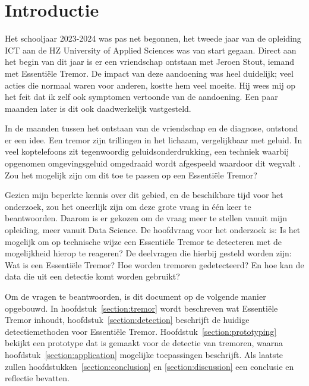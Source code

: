 \section{Introductie}

Het schooljaar 2023-2024 was pas net begonnen,
het tweede jaar van de opleiding ICT aan de HZ University of Applied Sciences was van start gegaan.
Direct aan het begin van dit jaar is er een vriendschap ontstaan met Jeroen Stout, iemand met Essentiële Tremor.
De impact van deze aandoening was heel duidelijk; veel acties die normaal waren voor anderen, kostte hem veel moeite.
Hij wees mij op het feit dat ik zelf ook symptomen vertoonde van de aandoening.
Een paar maanden later is dit ook daadwerkelijk vastgesteld.

In de maanden tussen het ontstaan van de vriendschap en de diagnose, ontstond er een idee.
Een tremor zijn trillingen in het lichaam, vergelijkbaar met geluid.
In veel koptelefoons zit tegenwoordig geluidsonderdrukking,
een techniek waarbij opgenomen omgevingsgeluid omgedraaid wordt afgespeeld waardoor dit wegvalt \cite{bose2023}.
Zou het mogelijk zijn om dit toe te passen op een Essentiële Tremor?

Gezien mijn beperkte kennis over dit gebied, en de beschikbare tijd voor het onderzoek,
zou het oneerlijk zijn om deze grote vraag in één keer te beantwoorden.
Daarom is er gekozen om de vraag meer te stellen vanuit mijn opleiding, meer vanuit Data Science.
De hoofdvraag voor het onderzoek is:
Is het mogelijk om op technische wijze een Essentiële Tremor te detecteren met de mogelijkheid hierop te reageren?
De deelvragen die hierbij gesteld worden zijn: Wat is een Essentiële Tremor? Hoe worden tremoren gedetecteerd?
En hoe kan de data die uit een detectie komt worden gebruikt?

Om de vragen te beantwoorden, is dit document op de volgende manier opgebouwd. 
In hoofdstuk~\ref{section:tremor} wordt beschreven wat Essentiële Tremor inhoudt,
hoofdstuk~\ref{section:detection} beschrijft de huidige detectiemethoden voor Essentiële Tremor.
Hoofdstuk~\ref{section:prototyping} bekijkt een prototype dat is gemaakt voor de detectie van tremoren,
waarna hoofdstuk~\ref{section:application} mogelijke toepassingen beschrijft.
Als laatste zullen hoofdstukken~\ref{section:conclusion} en \ref{section:discussion} een conclusie en reflectie bevatten.
